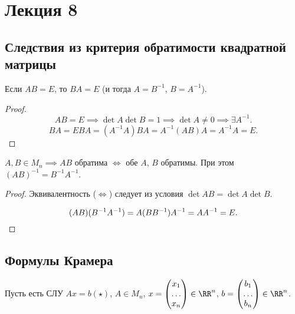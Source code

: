 \section{Лекция 8}


\subsection{Следствия из критерия обратимости квадратной матрицы}

\begin{corollary}
    Если $AB = E$, то $BA = E$ (и тогда $A = B^{-1}$, $B = A^{-1}$).
\end{corollary}

\begin{proof}
    \label{proof:ab_inverse}
    \begin{equation*}
        AB = E \implies \det A \det B = 1 \implies \det A \neq 0 \implies \exists A^{-1}
    .\end{equation*}
    \begin{equation*}
        BA = EBA = (A^{-1}A)BA = A^{-1}(AB)A = A^{-1}A = E
    .\end{equation*}
\end{proof}

\begin{corollary}
    $A, B \in M_n \implies AB$ обратима $\iff$ обе $A$, $B$ обратимы. При этом $(AB)^{-1} = B^{-1} A^{-1}$.
\end{corollary}

\begin{proof}
    Эквивалентность ($\iff$) следует из условия $\det AB = \det A \det B$.

    \begin{equation*}
        (AB)(B^{-1}A^{-1}) = A(BB^{-1})A^{-1} = A A^{-1} = E
    .\qedhere\end{equation*}
\end{proof}

\subsection{Формулы Крамера}

Пусть есть СЛУ $Ax = b (\star)$, $A \in M_n$, $x = \begin{pmatrix} x_1 \\ \dots \\ x_n \end{pmatrix} \in \RR^n$, $b = \begin{pmatrix} b_1 \\ \dots \\ b_n \end{pmatrix} \in \RR^n$.

